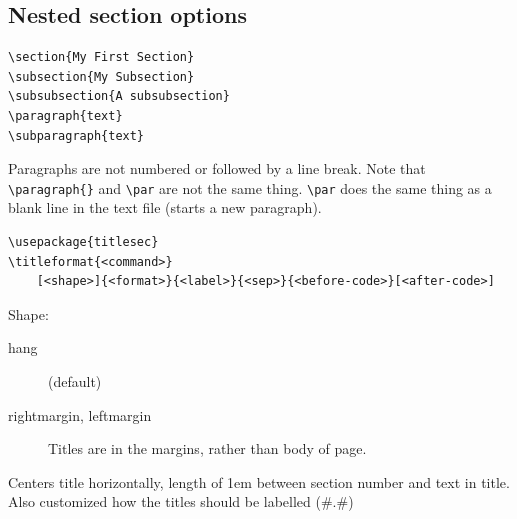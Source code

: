\documentclass{article}
\begin{document}
\subsection{Nested section options}
\begin{minipage}[t]{0.5\textwidth}
\begin{lstlisting}
\section{My First Section}
\subsection{My Subsection}
\subsubsection{A subsubsection}
\paragraph{text}
\subparagraph{text}
\end{lstlisting}
\end{minipage}
\begin{minipage}[t]{0.5\textwidth}
Paragraphs are not numbered or followed by a line break.
Note that \verb|\paragraph{}| and \verb|\par| are not the same thing.
\verb|\par| does the same thing as a blank line in the text file (starts a new paragraph).
\end{minipage}

\begin{lstlisting}
\usepackage{titlesec}
\titleformat{<command>}
    [<shape>]{<format>}{<label>}{<sep>}{<before-code>}[<after-code>]
\end{lstlisting}

Shape:
\begin{description}
    \item [hang] (default)
    \item [rightmargin, leftmargin] Titles are in the margins, rather than
        body of page.
\end{description}

Centers title horizontally, length of 1em between section number
and text in title. Also customized how the titles should be labelled
(\#.\#)
\end{document}
